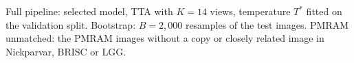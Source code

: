 Full pipeline: selected model, TTA with $K{=}14$ views, temperature $T^{*}$ fitted on the validation split. Bootstrap: $B=2,000$ resamples of the test images. PMRAM unmatched: the PMRAM images without a copy or closely related image in Nickparvar, BRISC or LGG.
